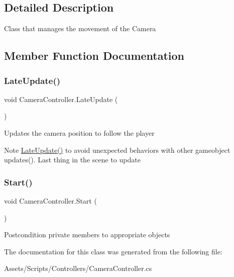 \subsection{Detailed Description}
Class that manages the movement of the Camera 

\subsection{Member Function Documentation}
\mbox{\label{class_camera_controller_afcd241727886518c21b9609193e32d18}} 
\subsubsection{\texorpdfstring{Late\+Update()}{LateUpdate()}}
{\footnotesize\ttfamily void Camera\+Controller.\+Late\+Update (\begin{DoxyParamCaption}{ }\end{DoxyParamCaption})\hspace{0.3cm}{\ttfamily [private]}}

Updates the camera position to follow the player \begin{DoxyNote}{Note}
\hyperlink{class_camera_controller_afcd241727886518c21b9609193e32d18}{Late\+Update()} to avoid unexpected behaviors with other gameobject updates(). Last thing in the scene to update 
\end{DoxyNote}
\mbox{\label{class_camera_controller_ad4a238c6f7db3ee003302a245d860860}} 
\subsubsection{\texorpdfstring{Start()}{Start()}}
{\footnotesize\ttfamily void Camera\+Controller.\+Start (\begin{DoxyParamCaption}{ }\end{DoxyParamCaption})\hspace{0.3cm}{\ttfamily [private]}}

\begin{DoxyPostcond}{Postcondition}
private members to appropriate objects 
\end{DoxyPostcond}


The documentation for this class was generated from the following file\+:\begin{DoxyCompactItemize}
\item 
Assets/\+Scripts/\+Controllers/Camera\+Controller.\+cs\end{DoxyCompactItemize}
